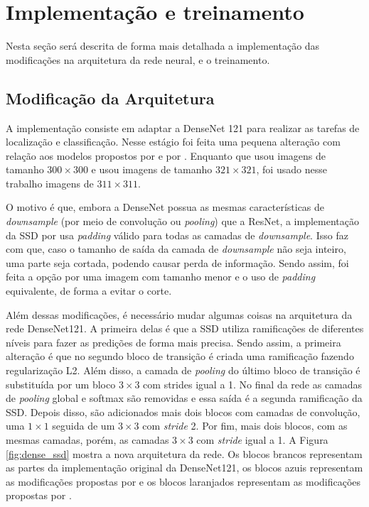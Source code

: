 \section{Implementação e treinamento}
\label{sec:4:3}

Nesta seção será descrita de forma mais detalhada a implementação das modificações na arquitetura da rede neural, e o treinamento.


\subsection{Modificação da Arquitetura}
\label{secao:4:3:1}

A implementação consiste em adaptar a \ac{DenseNet} 121 para realizar as tarefas de localização e classificação. Nesse estágio foi feita uma pequena alteração com relação aos modelos propostos por  e por . Enquanto que  usou imagens de tamanho $300 \times 300$ e  usou imagens de tamanho $321\times 321$, foi usado nesse trabalho imagens de $311 \times 311$.

O motivo é que, embora a \ac{DenseNet} possua as mesmas características de \textit{downsample} (por meio de convolução ou \textit{pooling}) que a \ac{ResNet}, a implementação da \ac{SSD} por  usa \textit{padding} válido para todas as camadas de \textit{downsample}. Isso faz com que, caso o tamanho de saída da camada de \textit{downsample} não seja inteiro, uma parte seja cortada, podendo causar perda de informação. Sendo assim, foi feita a opção por uma imagem com tamanho menor e o uso de \textit{padding} equivalente, de forma a evitar o corte.

Além dessas modificações, é necessário mudar algumas coisas na arquitetura da rede \ac{DenseNet}121. A primeira delas é que a SSD utiliza ramificações de diferentes níveis para fazer as predições de forma mais precisa. Sendo assim, a primeira alteração é que no segundo bloco de transição é criada uma ramificação fazendo regularização L2. Além disso, a camada de \textit{pooling} do último bloco de transição é substituída por um bloco $3\times3$ com strides igual a 1. No final da rede as camadas de \textit{pooling} global e softmax são removidas e essa saída é a segunda ramificação da \ac{SSD}. Depois disso, são adicionados mais dois blocos com camadas de convolução, uma $1\times1$ seguida de um $3\times3$ com \textit{stride} 2. Por fim, mais dois blocos, com as mesmas camadas, porém, as camadas $3\times3$ com \textit{stride} igual a 1. A Figura \ref{fig:dense_ssd} mostra a nova arquitetura da rede. Os blocos brancos representam as partes da implementação original da \ac{DenseNet}121, os blocos azuis representam as modificações propostas por  e os blocos laranjados representam as modificações propostas por .

